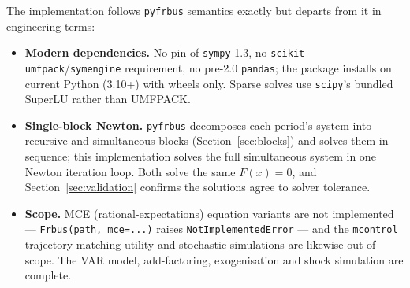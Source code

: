The implementation follows \texttt{pyfrbus} semantics exactly but departs from it in engineering terms:
\begin{itemize}
  \item \textbf{Modern dependencies.} No pin of \texttt{sympy} 1.3, no \texttt{scikit-umfpack}/\texttt{symengine} requirement, no pre-2.0 \texttt{pandas}; the package installs on current Python (3.10+) with wheels only. Sparse solves use \texttt{scipy}'s bundled SuperLU rather than UMFPACK.
  \item \textbf{Single-block Newton.} \texttt{pyfrbus} decomposes each period's system into recursive and simultaneous blocks (Section~\ref{sec:blocks}) and solves them in sequence; this implementation solves the full simultaneous system in one Newton iteration loop. Both solve the same $F(x)=0$, and Section~\ref{sec:validation} confirms the solutions agree to solver tolerance.
  \item \textbf{Scope.} MCE (rational-expectations) equation variants are not implemented --- \texttt{Frbus(path, mce=...)} raises \texttt{NotImplementedError} --- and the \texttt{mcontrol} trajectory-matching utility and stochastic simulations are likewise out of scope. The VAR model, add-factoring, exogenisation and shock simulation are complete.
\end{itemize}
